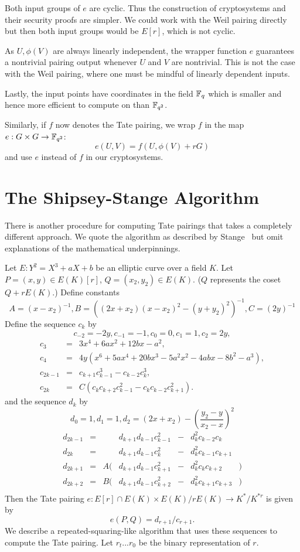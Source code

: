 Both input groups of $e$ are cyclic.
Thus the construction of cryptosystems and their
security proofs are simpler. We could work with the
Weil pairing directly but then both input groups would be $E[r]$,
which is not cyclic.

As $U, \phi(V)$ are always linearly independent,
the wrapper function $e$ guarantees
a nontrivial pairing output whenever $U$ and $V$ are nontrivial.
This is not the case with the Weil pairing,
where one must be mindful of linearly dependent inputs.

Lastly, the input points have coordinates in the field $\mathbb{F}_q$ which is
smaller and hence more efficient to compute on than $\mathbb{F}_{q^2}$.

Similarly, if $f$ now denotes the Tate pairing,
we wrap $f$ in the map
$e : G\times G \rightarrow \mathbb{F}_{q^2}$:
\[ e(U, V) = f(U, \phi(V) + rG) \]
and use $e$ instead of $f$ in our cryptosystems.

\section {The Shipsey-Stange Algorithm}
There is another procedure for computing Tate pairings that takes a completely
different approach. We quote the algorithm as described by Stange~\cite{stange}
but omit explanations of the mathematical underpinnings.

Let $E:Y^2 = X^3 + aX + b$ be an elliptic curve over a field $K$.
Let $P=(x, y) \in E(K)[r]$, $Q=(x_2, y_2) \in E(K)$. ($Q$ represents the
coset $Q + rE(K)$.)
Define constants
\[
    A = (x - x_2)^{-1},
    B = \left((2x + x_2)(x - x_2)^2 - (y + y_2)^2\right)^{-1},
    C = (2 y)^{-1}
\]
Define the sequence $c_k$ by
\[
    c_{-2} = -2y,
    c_{-1} = -1,
    c_0 = 0,
    c_1 = 1,
    c_2 = 2 y,
\]
\[
\begin{array}{lcl}
    c_3 &=& 3 x^4 + 6ax^2 + 12bx - a^2, \\
    c_4 &=& 4y(x^6+5ax^4+20bx^3-5a^2x^2-4abx-8b^2-a^3), \\
    c_{2k-1} &=& c_{k+1} c_{k-1}^3 - c_{k-2} c_k^3, \\
    c_{2k} &=& C(c_k c_{k+2} c_{k-1}^2 - c_k c_{k-2} c_{k+1}^2).
\end{array}
\]
and the sequence $d_k$ by
\[
    d_0 = 1,
    d_1 = 1,
    d_2 = (2x+x_2) - \left( \frac{y_2-y}{x_2-x} \right) ^2
\]
\[
\begin{array}{lcrlcll}
    d_{2k-1} &=& & d_{k+1} d_{k-1} c_{k-1}^2 &-& d_k^2 c_{k-2} c_{k}& \\ 
    d_{2k} &=& & d_{k+1} d_{k-1} c_{k}^2 &-& d_k^2 c_{k-1} c_{k+1}& \\
    d_{2k+1} &=& A(& d_{k+1} d_{k-1} c_{k+1}^2 &-& d_k^2 c_{k} c_{k+2}&) \\
    d_{2k+2} &=& B(& d_{k+1} d_{k-1} c_{k+2}^2 &-& d_k^2 c_{k+1} c_{k+3}&) \\
\end{array}
\]
Then the Tate pairing
$
e : E[r] \cap E(K) \times
E(K) / r E(K) \rightarrow
K^* / K^{*r}
$
is given by
\[
e(P,Q) = d_{r+1}/c_{r+1}.
\]
We describe a repeated-squaring-like algorithm that uses these sequences
to compute the Tate pairing.
Let $r_t ... r_0$ be the binary representation of $r$.

